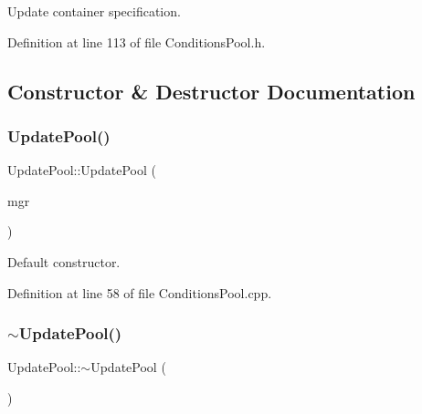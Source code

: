 Update container specification. 



Definition at line 113 of file Conditions\+Pool.\+h.



\subsection{Constructor \& Destructor Documentation}
\hypertarget{class_d_d4hep_1_1_conditions_1_1_update_pool_a906a53034c9d5f71194f1f0e0e0a82d2}{}\label{class_d_d4hep_1_1_conditions_1_1_update_pool_a906a53034c9d5f71194f1f0e0e0a82d2} 
\subsubsection{\texorpdfstring{Update\+Pool()}{UpdatePool()}}
{\footnotesize\ttfamily Update\+Pool\+::\+Update\+Pool (\begin{DoxyParamCaption}\item[{\hyperlink{class_d_d4hep_1_1_conditions_1_1_conditions_manager}{Conditions\+Manager}}]{mgr }\end{DoxyParamCaption})}



Default constructor. 



Definition at line 58 of file Conditions\+Pool.\+cpp.

\hypertarget{class_d_d4hep_1_1_conditions_1_1_update_pool_a6f6e54abf8c2d19be9166686fcd51215}{}\label{class_d_d4hep_1_1_conditions_1_1_update_pool_a6f6e54abf8c2d19be9166686fcd51215} 
\subsubsection{\texorpdfstring{$\sim$\+Update\+Pool()}{~UpdatePool()}}
{\footnotesize\ttfamily Update\+Pool\+::$\sim$\+Update\+Pool (\begin{DoxyParamCaption}{ }\end{DoxyParamCaption})\hspace{0.3cm}{\ttfamily [virtual]}}



